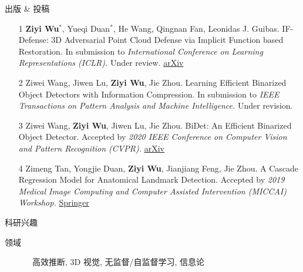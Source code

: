 \documentclass{resume} %
\begin{document}
\begin{rSection}{出版 \& 投稿}

\begin{enumerate}
\item[1] \textbf{Ziyi Wu}$^{*}$, Yueqi Duan$^{*}$, He Wang, Qingnan Fan, Leonidas J. Guibas. IF-Defense: 3D Adversarial Point Cloud Defense via Implicit Function based Restoration. In submission to \textit{International Conference on Learning Representations (ICLR).} Under review. \href{https://arxiv.org/abs/2010.05272}{arXiv}
\item[2] Ziwei Wang, Jiwen Lu, \textbf{Ziyi Wu}, Jie Zhou. Learning Efficient Binarized Object Detectors with Information Compression. In submission to \textit{IEEE Transactions on Pattern Analysis and Machine Intelligence.} Under revision.
\item[3] Ziwei Wang, \textbf{Ziyi Wu}, Jiwen Lu, Jie Zhou. BiDet: An Efficient Binarized Object Detector. Accepted by \textit{2020 IEEE Conference on Computer Vision and Pattern Recognition (CVPR).} \href{https://arxiv.org/abs/2003.03961}{arXiv}
\item[4] Zimeng Tan, Yongjie Duan, \textbf{Ziyi Wu}, Jianjiang Feng, Jie Zhou. A Cascade Regression Model for Anatomical Landmark Detection. Accepted by \textit{2019 Medical Image Computing and Computer Assisted Intervention (MICCAI) Workshop.} \href{https://link.springer.com/chapter/10.1007/978-3-030-39074-7_5}{Springer}
\end{enumerate}

\end{rSection}

\begin{rSection}{科研兴趣}

\begin{description}
    \item[领域] \quad\quad\, 
    高效推断, 
    3D 视觉, %
    无监督/自监督学习, 
    信息论
\end{description}

\end{rSection}
\end{document}
